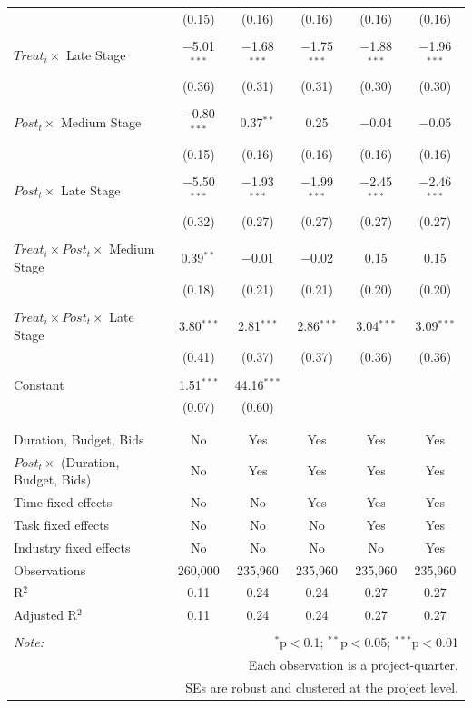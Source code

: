 \documentclass[
]{article}
\begin{document}
\begin{table}[H]
\begin{tabular}{@{\extracolsep{-2pt}}lccccc}
  & (0.15) & (0.16) & (0.16) & (0.16) & (0.16) \\ 
  & & & & & \\ 
 $Treat_i \times$ Late Stage & $-$5.01$^{***}$ & $-$1.68$^{***}$ & $-$1.75$^{***}$ & $-$1.88$^{***}$ & $-$1.96$^{***}$ \\ 
  & (0.36) & (0.31) & (0.31) & (0.30) & (0.30) \\ 
  & & & & & \\ 
 $Post_t \times$ Medium Stage & $-$0.80$^{***}$ & 0.37$^{**}$ & 0.25 & $-$0.04 & $-$0.05 \\ 
  & (0.15) & (0.16) & (0.16) & (0.16) & (0.16) \\ 
  & & & & & \\ 
 $Post_t \times$ Late Stage & $-$5.50$^{***}$ & $-$1.93$^{***}$ & $-$1.99$^{***}$ & $-$2.45$^{***}$ & $-$2.46$^{***}$ \\ 
  & (0.32) & (0.27) & (0.27) & (0.27) & (0.27) \\ 
  & & & & & \\ 
 $Treat_i \times Post_t \times$ Medium Stage & 0.39$^{**}$ & $-$0.01 & $-$0.02 & 0.15 & 0.15 \\ 
  & (0.18) & (0.21) & (0.21) & (0.20) & (0.20) \\ 
  & & & & & \\ 
 $Treat_i \times Post_t \times$ Late Stage & 3.80$^{***}$ & 2.81$^{***}$ & 2.86$^{***}$ & 3.04$^{***}$ & 3.09$^{***}$ \\ 
  & (0.41) & (0.37) & (0.37) & (0.36) & (0.36) \\ 
  & & & & & \\ 
 Constant & 1.51$^{***}$ & 44.16$^{***}$ &  &  &  \\ 
  & (0.07) & (0.60) &  &  &  \\ 
  & & & & & \\ 
\hline \\[-1.8ex] 
Duration, Budget, Bids & No & Yes & Yes & Yes & Yes \\ 
$Post_t \times $  (Duration, Budget, Bids) & No & Yes & Yes & Yes & Yes \\ 
Time fixed effects & No & No & Yes & Yes & Yes \\ 
Task fixed effects & No & No & No & Yes & Yes \\ 
Industry fixed effects & No & No & No & No & Yes \\ 
Observations & 260,000 & 235,960 & 235,960 & 235,960 & 235,960 \\ 
R$^{2}$ & 0.11 & 0.24 & 0.24 & 0.27 & 0.27 \\ 
Adjusted R$^{2}$ & 0.11 & 0.24 & 0.24 & 0.27 & 0.27 \\ 
\hline 
\hline \\[-1.8ex] 
\textit{Note:}  & \multicolumn{5}{r}{$^{*}$p$<$0.1; $^{**}$p$<$0.05; $^{***}$p$<$0.01} \\ 
 & \multicolumn{5}{r}{Each observation is a project-quarter.} \\ 
 & \multicolumn{5}{r}{SEs are robust and clustered at the project level.} \\ 
\end{tabular} 
\end{table}
\end{document}
